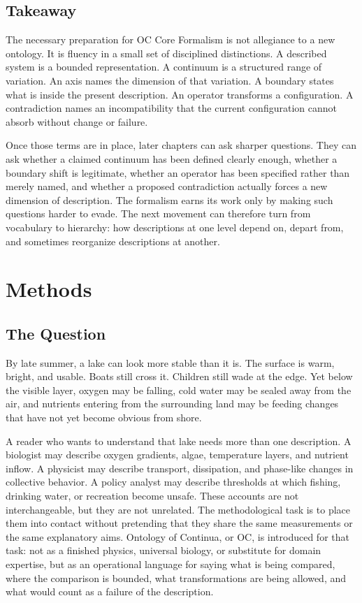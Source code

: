 \documentclass[11pt,a4paper,openany]{book}
\begin{document}
\subsection{Takeaway}
The necessary preparation for OC Core Formalism is not allegiance to a new ontology. It is fluency in a small set of disciplined distinctions. A described system is a bounded representation. A continuum is a structured range of variation. An axis names the dimension of that variation. A boundary states what is inside the present description. An operator transforms a configuration. A contradiction names an incompatibility that the current configuration cannot absorb without change or failure. \cite{kadanoff_scaling,wilson_renormalization}\par
Once those terms are in place, later chapters can ask sharper questions. They can ask whether a claimed continuum has been defined clearly enough, whether a boundary shift is legitimate, whether an operator has been specified rather than merely named, and whether a proposed contradiction actually forces a new dimension of description. The formalism earns its work only by making such questions harder to evade. The next movement can therefore turn from vocabulary to hierarchy: how descriptions at one level depend on, depart from, and sometimes reorganize descriptions at another.\par
\section{Methods}
\subsection{The Question}
By late summer, a lake can look more stable than it is. The surface is warm, bright, and usable. Boats still cross it. Children still wade at the edge. Yet below the visible layer, oxygen may be falling, cold water may be sealed away from the air, and nutrients entering from the surrounding land may be feeding changes that have not yet become obvious from shore. \cite{wilson_renormalization,landau_stat_physics}\par
A reader who wants to understand that lake needs more than one description. A biologist may describe oxygen gradients, algae, temperature layers, and nutrient inflow. A physicist may describe transport, dissipation, and phase-like changes in collective behavior. A policy analyst may describe thresholds at which fishing, drinking water, or recreation become unsafe. These accounts are not interchangeable, but they are not unrelated. The methodological task is to place them into contact without pretending that they share the same measurements or the same explanatory aims. Ontology of Continua, or OC, is introduced for that task: not as a finished physics, universal biology, or substitute for domain expertise, but as an operational language for saying what is being compared, where the comparison is bounded, what transformations are being allowed, and what would count as a failure of the description.\par
\end{document}
